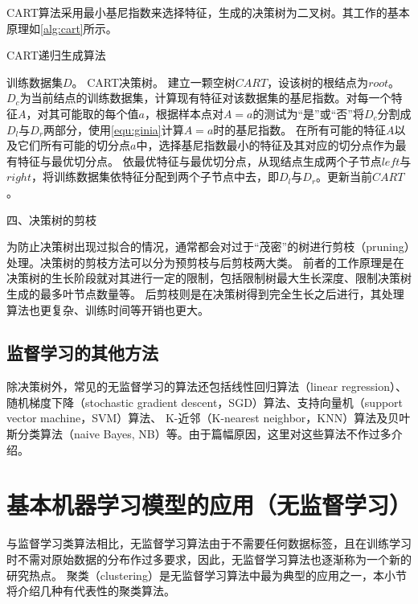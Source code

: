 CART算法采用最小基尼指数来选择特征，生成的决策树为二叉树。其工作的基本原理如\autoref{alg:cart}所示。
\begin{breakablealgorithm}
    \caption[CART生成算法]{CART递归生成算法\cite{Li2017}}
    \label{alg:cart}
    \begin{algorithmic}[1] %
        \Require 训练数据集$D$。
        \Ensure CART决策树。
        \State 建立一颗空树$CART$，设该树的根结点为$root$。
            \State $D_c$为当前结点的训练数据集，计算现有特征对该数据集的基尼指数。对每一个特征$A$，对其可能取的每个值$a$，根据样本点对$A=a$的测试为“是”或“否”将$D_c$分割成$D_l$与$D_r$两部分，使用\autoref{equ:ginia}计算$A=a$时的基尼指数。
            \State 在所有可能的特征$A$以及它们所有可能的切分点$a$中，选择基尼指数最小的特征及其对应的切分点作为最有特征与最优切分点。
            \State 依最优特征与最优切分点，从现结点生成两个子节点$left$与$right$，将训练数据集依特征分配到两个子节点中去，即$D_l$与$D_r$。更新当前$CART$。
                \State {}
            \Else    
                \State {}
                \State {}
            \EndIf
        \EndFunction
    \end{algorithmic}
\end{breakablealgorithm}

四、决策树的剪枝

为防止决策树出现过拟合的情况，通常都会对过于“茂密”的树进行剪枝（pruning）处理。决策树的剪枝方法可以分为预剪枝与后剪枝两大类。
前者的工作原理是在决策树的生长阶段就对其进行一定的限制，包括限制树最大生长深度、限制决策树生成的最多叶节点数量等。
后剪枝则是在决策树得到完全生长之后进行，其处理算法也更复杂、训练时间等开销也更大\cite{Zhou2016,Liu2018}。

\subsection{监督学习的其他方法}
除决策树外，常见的无监督学习的算法还包括线性回归算法（linear regression）、随机梯度下降（stochastic gradient descent，SGD）算法、支持向量机（support vector machine，SVM）算法、
K-近邻（K-nearest neighbor，KNN）算法及贝叶斯分类算法（naive Bayes, NB）等\cite{Zhou2016,Li2017,Liu2018,Aurélien2018}。由于篇幅原因，这里对这些算法不作过多介绍。


\section{基本机器学习模型的应用（无监督学习）}
与监督学习类算法相比，无监督学习算法由于不需要任何数据标签，且在训练学习时不需对原始数据的分布作过多要求，因此，无监督学习算法也逐渐称为一个新的研究热点。
聚类（clustering）是无监督学习算法中最为典型的应用之一，本小节将介绍几种有代表性的聚类算法。

